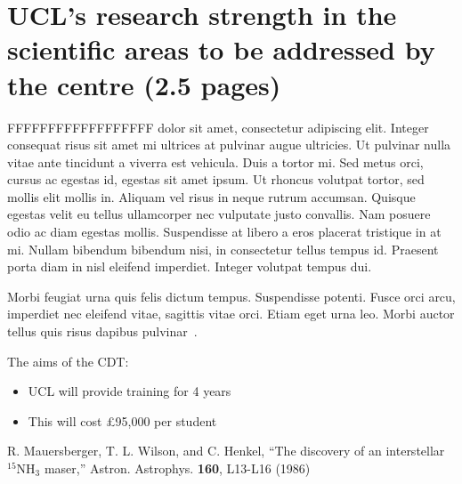 \documentclass[a4paper,onecolumn,11pt]{article}
\begin{document}
\section*{UCL's research strength in the scientific areas to be addressed by the centre (2.5 pages)}

 FFFFFFFFFFFFFFFFFF dolor sit amet, consectetur adipiscing elit. Integer consequat risus sit amet mi ultrices at pulvinar augue ultricies. Ut pulvinar nulla vitae ante tincidunt a viverra est vehicula. Duis a tortor mi. Sed metus orci, cursus ac egestas id, egestas sit amet ipsum. Ut rhoncus volutpat tortor, sed mollis elit mollis in. Aliquam vel risus in neque rutrum accumsan. Quisque egestas velit eu tellus ullamcorper nec vulputate justo convallis. Nam posuere odio ac diam egestas mollis. Suspendisse at libero a eros placerat tristique in at mi. Nullam bibendum bibendum nisi, in consectetur tellus tempus id. Praesent porta diam in nisl eleifend imperdiet. Integer volutpat tempus dui.

 Morbi feugiat urna quis felis dictum tempus. Suspendisse potenti. Fusce orci arcu, imperdiet nec eleifend vitae, sagittis vitae orci. Etiam eget urna leo. Morbi auctor tellus quis risus dapibus pulvinar~\citep{Mauersberger:1986}.

 The aims of the CDT: 
\begin{itemize}
\item UCL will provide training for 4 years
\item This will cost \pounds 95,000 per student
\end{itemize}

%
%
\begin{thebibliography}{1}
R. Mauersberger, T. L. Wilson, and C. Henkel,
``The discovery of an interstellar $^{15}$NH$_3$ maser,''
Astron. Astrophys. {\bf 160}, L13-L16 (1986)
\end{thebibliography}
\end{document}
